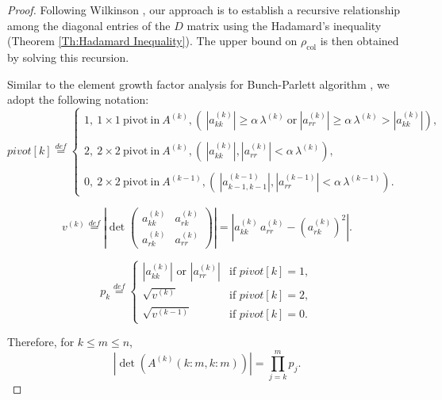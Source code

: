 \documentclass[11pt]{article}
\begin{document}
\begin{proof} Following Wilkinson \cite{wilkinson1961error}, our approach is to establish a recursive relationship among the diagonal entries of the $D$ matrix using the Hadamard's inequality (Theorem \ref{Th:Hadamard Inequality}). The upper bound on $\rho_{\textrm{col}}$ is then obtained by solving this recursion. 

Similar to the element growth factor analysis for Bunch-Parlett algorithm \cite{bunch1971analysis}, we adopt the following notation: 
\begin{equation*}
pivot[k] \stackrel{def}{=}
\left\{ 
\begin{array}{lll}
1, \:1 \times 1 ~\mbox{pivot} ~ \mbox{in} ~ A^{(k)}, \left( ~ \left| a_{k k}^{(k)} \right| \ge \alpha \, \lambda^{(k)} ~ \mbox{or} ~ \left| a_{r r}^{(k)} \right| \ge \alpha \, \lambda^{(k)} > \left| a_{k k}^{(k)} \right| \right), \\
\\
2, \:2 \times 2 ~\mbox{pivot} ~ \mbox{in} ~ A^{(k)}, \left( ~  \left| a_{k k}^{(k)} \right|, \left| a_{r r}^{(k)} \right| < \alpha \, \lambda^{(k)} \right),  \\
\\
0, \:2 \times 2 ~\mbox{pivot}~ \mbox{in} ~ A^{(k - 1)}, \left( ~ \left| a_{k-1, k-1}^{(k - 1)} \right|, \left| a_{r r}^{(k - 1)} \right| < \alpha \, \lambda^{(k-1)}\right).
\end{array}
\right.
\end{equation*}

$$v^{(k)} \stackrel{def}{=} \left| \det \left( \begin{array}{cc}
a_{k k}^{(k)} & a_{r k}^{(k)} \\
a_{r k}^{(k)} & a_{r r}^{(k)}
\end{array}
\right) \right| = \left| a_{k k}^{(k)} \, a_{r r}^{(k)} - \left( a_{r k}^{(k)} \right)^2 \right|.$$

$$
p_k \stackrel{def}{=} \left\{ \begin{array}{ll}
\mbox{$\left|a_{k k}^{(k)}\right|$ or $\left|a_{r r}^{(k)}\right|$} & \mbox{if $pivot[k] = 1,$} \\
\sqrt{v^{(k)}} & \mbox{if $pivot[k] = 2,$} \\
\sqrt{v^{(k-1)}} & \mbox{if $pivot[k] = 0.$}
\end{array}
\right.
$$

Therefore, for $k \le m \le n$,
\begin{equation}\label{Eq:determinant value of A}
\left| \det \left( A^{(k)}(k : m, k : m) \right) \right| = \prod_{j = k}^m p_j.
\end{equation}


\end{proof}
\end{document}
